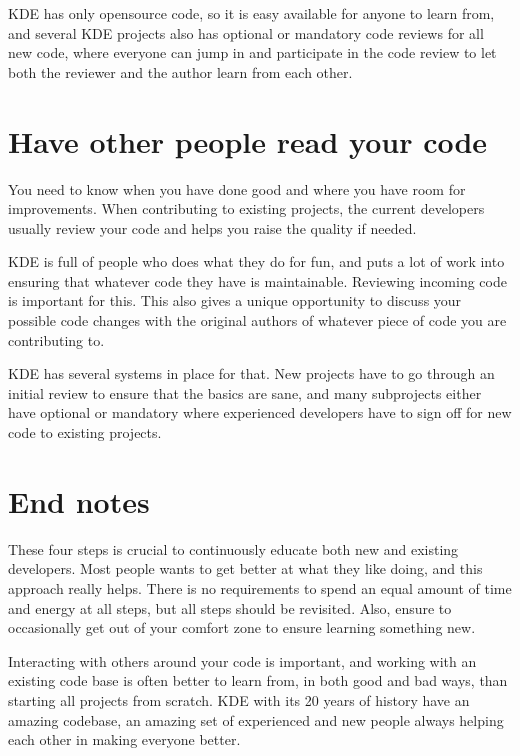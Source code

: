 KDE has only opensource code, so it is easy available for anyone to learn from, and several KDE projects also has optional or mandatory code reviews for all new code, where everyone can jump in and participate in the code review to let both the reviewer and the author learn from each other.

\section*{Have other people read your code}
You need to know when you have done good and where you have room for improvements. When contributing to existing projects, the current developers usually review your code and helps you raise the quality if needed.

KDE is full of people who does what they do for fun, and puts a lot of work into ensuring that whatever code they have is maintainable. Reviewing incoming code is important for this. This also gives a unique opportunity to discuss your possible code changes with the original authors of whatever piece of code you are contributing to.

KDE has several systems in place for that. New projects have to go through an initial review to ensure that the basics are sane, and many subprojects either have optional or mandatory where experienced developers have to sign off for new code to existing projects.

\section*{End notes}
These four steps is crucial to continuously educate both new and existing developers. Most people wants to get better at what they like doing, and this approach really helps. There is no requirements to spend an equal amount of time and energy at all steps, but all steps should be revisited. Also, ensure to occasionally get out of your comfort zone to ensure learning something new.

Interacting with others around your code is important, and working with an existing code base is often better to learn from, in both good and bad ways, than starting all projects from scratch. KDE with its 20 years of history have an amazing codebase, an amazing set of experienced and new people always helping each other in making everyone better.

